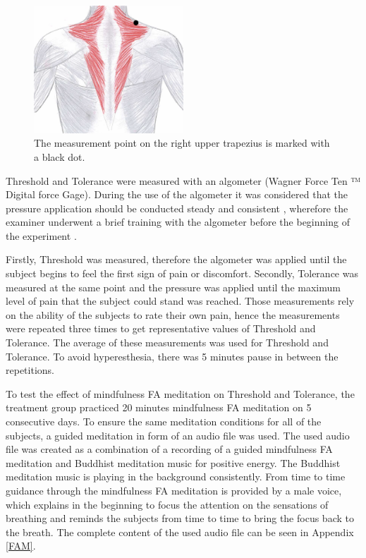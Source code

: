 \begin{figure}[H]
	\includegraphics[width=0.5\textwidth]{figures/trapezius} 
	\caption{The measurement point on the right upper trapezius is marked with a black dot.}
	\label{fig:trapezius}  
\end{figure}  

Threshold and Tolerance were measured with an algometer (Wagner Force Ten ™  Digital force Gage). During the use of the algometer it was considered that the pressure application should be conducted steady and consistent \cite{Fischer1987, Kinser2009}, wherefore the examiner underwent a brief training with the algometer before the beginning of the experiment \cite{ Kinser2009, Vaughan2007}. 

Firstly, Threshold was measured, therefore the algometer was applied until the subject begins to feel the first sign of pain or discomfort. Secondly, Tolerance was measured at the same point and the pressure was applied until the maximum level of pain that the subject could stand was reached. Those measurements rely on the ability of the subjects to rate their own pain, hence the measurements were repeated three times to get representative values of Threshold and Tolerance. The average of these measurements was used for Threshold and Tolerance. To avoid hyperesthesia, there was 5 minutes pause in between the repetitions. 

To test the effect of mindfulness FA meditation on Threshold and Tolerance, the treatment group practiced 20 minutes mindfulness FA meditation on 5 consecutive days. To ensure the same meditation conditions for all of the subjects, a guided meditation in form of an audio file was used. The used audio file was created as a combination of a recording of a guided mindfulness FA meditation and Buddhist meditation music for positive energy. The Buddhist meditation music is playing in the background consistently. From time to time guidance through the mindfulness FA meditation is provided by a male voice, which explains in the beginning to focus the attention on the sensations of breathing and reminds the subjects from time to time to bring the focus back to the breath. The complete content of the used audio file can be seen in Appendix \ref{FAM}.

